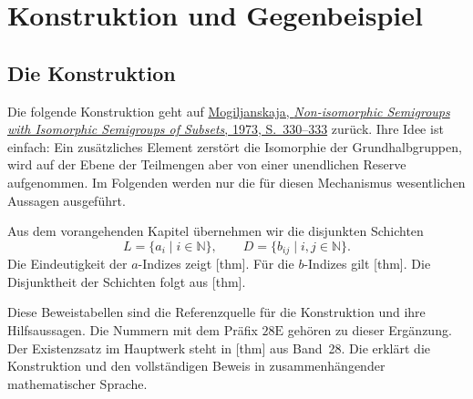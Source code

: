\chapter{Konstruktion und Gegenbeispiel}
\section{Die Konstruktion}

Die folgende Konstruktion geht auf
\href{https://doi.org/10.1007/BF02389140}%
  {Mogiljanskaja, \emph{Non-isomorphic Semigroups with Isomorphic
  Semigroups of Subsets}, 1973, S.~330--333}
zurück. Ihre Idee ist einfach: Ein zusätzliches Element zerstört die
Isomorphie der Grundhalbgruppen, wird auf der Ebene der Teilmengen aber von
einer unendlichen Reserve aufgenommen. Im Folgenden werden nur die für diesen
Mechanismus wesentlichen Aussagen ausgeführt.

Aus dem vorangehenden Kapitel übernehmen wir die disjunkten Schichten
\[
  L=\{a_i\mid i\in\mathbb N\},
  \qquad
  D=\{b_{ij}\mid i,j\in\mathbb N\}.
\]
Die Eindeutigkeit der \(a\)-Indizes zeigt
[thm].
Für die \(b\)-Indizes gilt [thm].
Die Disjunktheit der Schichten folgt aus
[thm].

Diese Beweistabellen sind die Referenzquelle für die Konstruktion und
ihre Hilfsaussagen. Die Nummern mit dem Präfix \(28\mathrm E\) gehören zu
dieser Ergänzung. Der Existenzsatz im Hauptwerk steht in
[thm] aus Band~28.
Die \MogReadingLink{} erklärt die Konstruktion und den vollständigen
Beweis in zusammenhängender mathematischer Sprache.


